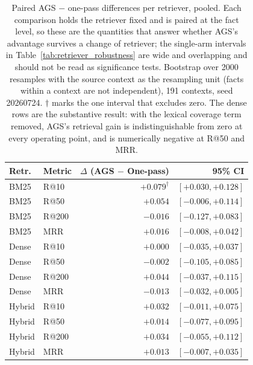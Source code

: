 \begin{table}[h]
\centering
\small
\begin{tabular}{@{}llrr@{}}
\toprule
\textbf{Retr.} & \textbf{Metric} & \textbf{$\Delta$ (AGS $-$ One-pass)} & \textbf{95\% CI} \\
\midrule
BM25 & R@10 & $+0.079^{\dagger}$ & $[+0.030, +0.128]$ \\
BM25 & R@50 & $+0.054$ & $[-0.006, +0.114]$ \\
BM25 & R@200 & $-0.016$ & $[-0.127, +0.083]$ \\
BM25 & MRR & $+0.016$ & $[-0.008, +0.042]$ \\
\midrule
Dense & R@10 & $+0.000$ & $[-0.035, +0.037]$ \\
Dense & R@50 & $-0.002$ & $[-0.105, +0.085]$ \\
Dense & R@200 & $+0.044$ & $[-0.037, +0.115]$ \\
Dense & MRR & $-0.013$ & $[-0.032, +0.005]$ \\
\midrule
Hybrid & R@10 & $+0.032$ & $[-0.011, +0.075]$ \\
Hybrid & R@50 & $+0.014$ & $[-0.077, +0.095]$ \\
Hybrid & R@200 & $+0.034$ & $[-0.055, +0.112]$ \\
Hybrid & MRR & $+0.013$ & $[-0.007, +0.035]$ \\
\bottomrule
\end{tabular}
\caption{Paired AGS $-$ one-pass differences per retriever, pooled. Each comparison holds the
retriever fixed and is paired at the fact level, so these are the quantities that answer whether
AGS's advantage survives a change of retriever; the single-arm intervals in
Table~\ref{tab:retriever_robustness} are wide and overlapping and should not be read as
significance tests. Bootstrap over 2000 resamples with the source context as the resampling
unit (facts within a context are not independent), 191 contexts, seed 20260724.
$\dagger$ marks the one interval that excludes zero. The dense rows are the substantive result:
with the lexical coverage term removed, AGS's retrieval gain is indistinguishable from zero at
every operating point, and is numerically negative at R@50 and MRR.}
\label{tab:retriever_robustness_deltas}
\end{table}
